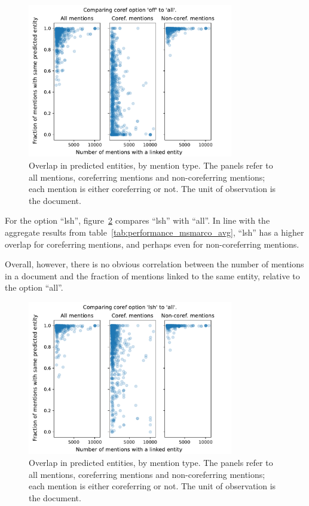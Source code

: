 \documentclass[a4paper,11pt]{article}
\numberwithin{equation}{section} %
\begin{document}
\begin{figure}[H]
  \centering
  \includegraphics[width = 0.8\textwidth]{../figs/msmarco_overlap_off.pdf}
  \caption{Overlap in predicted entities, by mention type. The panels refer to all mentions, coreferring mentions and non-coreferring mentions; each mention is either coreferring or not. The unit of observation is the document. }
  \label{fig:msmarco_overlap_off}
\end{figure}

For the option ``lsh'', figure~\ref{fig:msmarco_overlap_lsh} compares ``lsh'' with ``all''. In line with the aggregate results from table~\ref{tab:performance_msmarco_avg}, ``lsh'' has a higher overlap for coreferring mentions, and perhaps even for non-coreferring mentions.

Overall, however, there is no obvious correlation between the number of mentions in a document and the fraction of mentions linked to the same entity, relative to the option ``all''. 

\begin{figure}[H]
  \centering
  \includegraphics[width = 0.8\textwidth]{../figs/msmarco_overlap_lsh.pdf}
  \caption{Overlap in predicted entities, by mention type. The panels refer to all mentions, coreferring mentions and non-coreferring mentions; each mention is either coreferring or not. The unit of observation is the document. }
  \label{fig:msmarco_overlap_lsh}
\end{figure}
\end{document}
